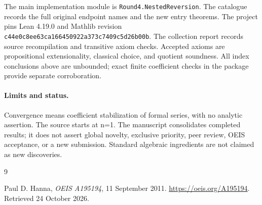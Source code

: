 \documentclass[11pt,a4paper]{article}
\theoremstyle{remark}
\begin{document}
The main implementation module is \nolinkurl{Round4.NestedReversion}.
The catalogue records the full original endpoint names and the new entry
theorems. The project pins Lean 4.19.0 and Mathlib revision
\nolinkurl{c44e0c8ee63ca166450922a373c7409c5d26b00b}. The collection
report records source recompilation and transitive axiom checks. Accepted
axioms are propositional extensionality, classical choice, and quotient
soundness. All index conclusions above are unbounded; exact finite
coefficient checks in the package provide separate corroboration.

\paragraph{Limits and status.}
Convergence means coefficient stabilization of formal series, with no analytic assertion. The source starts at n=1.
The manuscript consolidates completed results; it does not assert global
novelty, exclusive priority, peer review, OEIS acceptance, or a new submission.
Standard algebraic ingredients are not claimed as new discoveries.

\begin{thebibliography}{9}
\raggedright
{}
Paul D. Hanna, \emph{OEIS A195194}, 11 September 2011.
\url{https://oeis.org/A195194}. Retrieved 24 October 2026.
\end{thebibliography}
\end{document}
